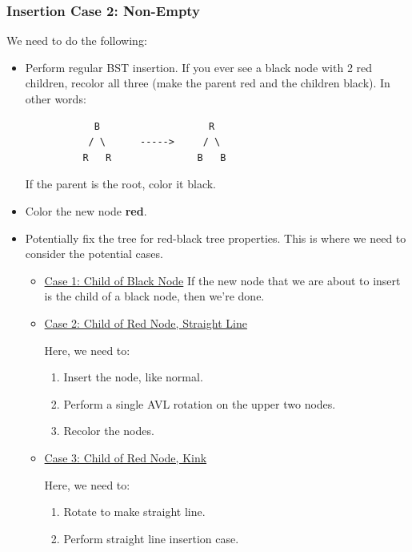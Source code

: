 \documentclass[letterpaper]{article}
\begin{document}
\subsubsection{Insertion Case 2: Non-Empty}
We need to do the following: 
\begin{itemize}
    \item Perform regular BST insertion. If you ever see a black node with 2 red children, recolor all three (make the parent red and the children black). In other words: 
    \begin{verbatim}
            B                   R
           / \      ----->     / \ 
          R   R               B   B
    \end{verbatim}
    If the parent is the root, color it black. 

    \item Color the new node \textbf{red}. 
    
    \item Potentially fix the tree for red-black tree properties. This is where we need to consider the potential cases.
    
    \begin{itemize}
        \item \underline{Case 1: Child of Black Node}
        If the new node that we are about to insert is the child of a black node, then we're done.

        \item \underline{Case 2: Child of Red Node, Straight Line}

        Here, we need to: 
        \begin{enumerate}
            \item Insert the node, like normal. 
            \item Perform a single AVL rotation on the upper two nodes. 
            \item Recolor the nodes. 
        \end{enumerate}

        \item \underline{Case 3: Child of Red Node, Kink}
    
        Here, we need to: 
        \begin{enumerate}
            \item Rotate to make straight line. 
            \item Perform straight line insertion case. 
        \end{enumerate}
    \end{itemize}
\end{itemize}
\end{document}
